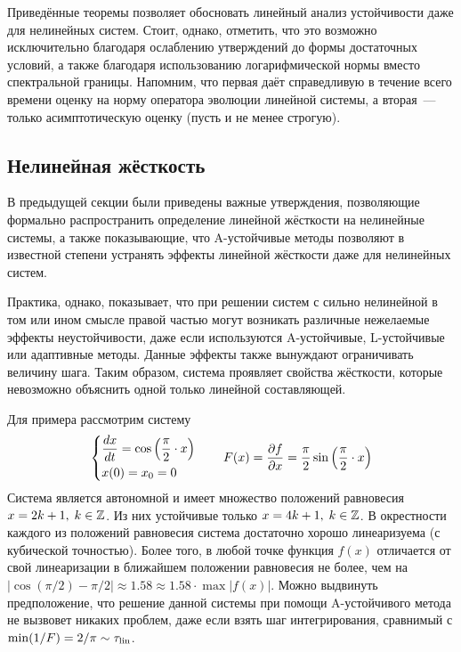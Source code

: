 Приведённые теоремы позволяет обосновать линейный анализ устойчивости даже для нелинейных систем.
Стоит, однако, отметить, что это возможно исключительно благодаря ослаблению утверждений до формы достаточных условий,
а также благодаря использованию логарифмической нормы вместо спектральной границы.
Напомним, что первая даёт справедливую в течение всего времени оценку на норму оператора эволюции линейной системы,
а вторая~--- только асимптотическую оценку (пусть и не менее строгую).


\subsection{Нелинейная жёсткость}
\label{subsec:nonlinear_stiffness}

В предыдущей секции были приведены важные утверждения,
позволяющие формально распространить определение линейной жёсткости на нелинейные системы,
а также показывающие, что A-устойчивые методы позволяют в известной степени устранять эффекты линейной жёсткости даже для нелинейных систем.

Практика, однако, показывает, что при решении систем с сильно нелинейной в том или ином смысле правой частью
могут возникать различные нежелаемые эффекты неустойчивости,
даже если используются A-устойчивые, L-устойчивые или адаптивные методы.
Данные эффекты также вынуждают ограничивать величину шага.
Таким образом, система проявляет свойства жёсткости, которые невозможно объяснить одной только линейной составляющей.

Для примера рассмотрим систему
%
\begin{equation}
    \label{eq:cosine_system}
    \begin{dcases}
        \frac{d x}{d t} = \cos\left( \frac{\pi}{2} \cdot x \right) \\
        x(0) = x_0 = 0
    \end{dcases}
    \qquad
    F(x) = \frac{\partial f}{\partial x} = \frac{\pi}{2} \sin\left( \frac{\pi}{2} \cdot x \right)
\end{equation}
%
Система является автономной и имеет множество положений равновесия $ x = 2k + 1, \; k \in \mathbb{Z} $.
Из них устойчивые только $ x = 4k + 1, \; k \in \mathbb{Z} $.
В окрестности каждого из положений равновесия система достаточно хорошо линеаризуема (с кубической точностью).
Более того, в любой точке функция $ f(x) $ отличается от свой линеаризации в ближайшем положении равновесия не более, чем на
$ |\cos(\pi/2) - \pi/2| \approx 1.58 \approx 1.58 \cdot \max |f(x)| $.
Можно выдвинуть предположение, что решение данной системы при помощи A-устойчивого метода не вызвовет никаких проблем,
даже если взять шаг интегрирования, сравнимый с $ \min (1 / F) = 2 / \pi \sim \tau_{\textnormal{lin}} $.

